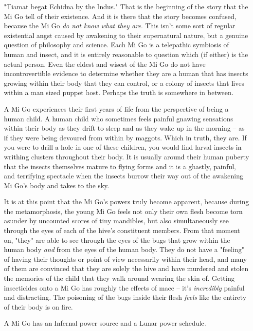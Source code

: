 "Tiamat begat Echidna by the Indus." That is the beginning of the story that the Mi Go tell of their existence. And it is there that the story becomes confused, because the Mi Go \textit{do not know what they are}. This isn't some sort of regular existential angst caused by awakening to their supernatural nature, but a genuine question of philosophy and science. Each Mi Go is a telepathic symbiosis of human and insect, and it is entirely reasonable to question which (if either) is the actual person. Even the eldest and wisest of the Mi Go do not have incontrovertible evidence to determine whether they are a human that has insects growing within their body that they can control, or a colony of insects that lives within a man sized puppet host. Perhaps the truth is somewhere in between.

A Mi Go experiences their first years of life from the perspective of being a human child. A human child who sometimes feels painful gnawing sensations within their body as they drift to sleep and as they wake up in the morning -- as if they were being devoured from within by maggots. Which in truth, they are. If you were to drill a hole in one of these children, you would find larval insects in writhing clusters throughout their body. It is usually around their human puberty that the insects themselves mature to flying forms and it is a ghastly, painful, and terrifying spectacle when the insects burrow their way out of the awakening Mi Go's body and takes to the sky.

It is at this point that the Mi Go's powers truly become apparent, because during the metamorphosis, the young Mi Go feels not only their own flesh become torn asunder by uncounted scores of tiny mandibles, but also simultaneously see through the eyes of each of the hive's constituent members. From that moment on, "they" are able to see through the eyes of the bugs that grow within the human body \textit{and} from the eyes of the human body. They do not have a "feeling" of having their thoughts or point of view necessarily within their head, and many of them are convinced that they are solely the hive and have murdered and stolen the memories of the child that they walk around wearing the skin of. Getting insecticides onto a Mi Go has roughly the effects of mace -- it's \textit{incredibly} painful and distracting. The poisoning of the bugs inside their flesh \textit{feels} like the entirety of their body is on fire.

A Mi Go has an Infernal power source and a Lunar power schedule.

